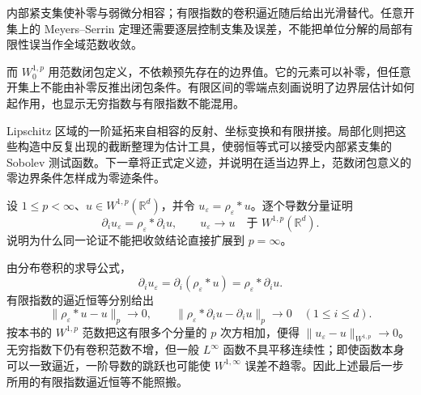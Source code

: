 




\begin{chaptersummary}
内部紧支集使补零与弱微分相容；有限指数的卷积逼近随后给出光滑替代。任意开集上的 Meyers--Serrin 定理还需要逐层控制支集及误差，不能把单位分解的局部有限性误当作全域范数收敛。

\ProseParagraphBreak

而 \(W_0^{1,p}\) 用范数闭包定义，不依赖预先存在的边界值。它的元素可以补零，但任意开集上不能由补零反推出闭包条件。有限区间的零端点刻画说明了边界层估计如何起作用，也显示无穷指数与有限指数不能混用。

\ProseParagraphBreak

Lipschitz 区域的一阶延拓来自相容的反射、坐标变换和有限拼接。局部化则把这些构造中反复出现的截断整理为估计工具，使弱恒等式可以接受内部紧支集的 Sobolev 测试函数。下一章将正式定义迹，并说明在适当边界上，范数闭包意义的零边界条件怎样成为零迹条件。
\end{chaptersummary}

\BookExercises


\begin{exercise}\label{b1:ex:22-basic-sobolev-mollification}
设 \(1\le p<\infty\)、\(u\in W^{1,p}(\mathbb R^d)\)，并令
\(u_\varepsilon=\rho_\varepsilon*u\)。逐个导数分量证明
\[
 \partial_i u_\varepsilon=\rho_\varepsilon*\partial_i u,\qquad
 u_\varepsilon\longrightarrow u\quad\text{于 }W^{1,p}(\mathbb R^d).
\]
说明为什么同一论证不能把收敛结论直接扩展到 \(p=\infty\)。
\end{exercise}
\begin{solution}
由分布卷积的求导公式，
\[
 \partial_i u_\varepsilon
 =\partial_i(\rho_\varepsilon*u)
 =\rho_\varepsilon*\partial_i u.
\]
有限指数的逼近恒等分别给出
\[
 \|\rho_\varepsilon*u-u\|_p\longrightarrow0,\qquad
 \|\rho_\varepsilon*\partial_i u-\partial_i u\|_p\longrightarrow0
 \quad(1\le i\le d).
\]
按本书的 \(W^{1,p}\) 范数把这有限多个分量的 \(p\) 次方相加，便得
\(\|u_\varepsilon-u\|_{W^{1,p}}\to0\)。无穷指数下仍有卷积范数不增，但一般 \(L^\infty\) 函数不具平移连续性；即使函数本身可以一致逼近，一阶导数的跳跃也可能使 \(W^{1,\infty}\) 误差不趋零。因此上述最后一步所用的有限指数逼近恒等不能照搬。
\end{solution}


